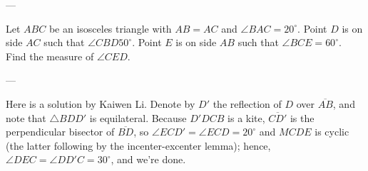 
---

Let $ABC$ be an isosceles triangle with $AB=AC$ and $\angle BAC=20^\circ$. Point $D$ is on side $AC$ such that $\angle CBD 50^\circ$. Point $E$ is on side $AB$ such that $\angle BCE=60^\circ$. Find the measure of $\angle CED$.

---

Here is a solution by Kaiwen Li. Denote by $D'$ the reflection of $D$ over $\overline{AB}$, and note that $\triangle BDD'$ is equilateral. Because $D'DCB$ is a kite, $\overline{CD'}$ is the perpendicular bisector of $\overline{BD}$, so $\angle ECD'=\angle ECD=20^\circ$ and $MCDE$ is cyclic (the latter following by the incenter-excenter lemma); hence, $\angle DEC=\angle DD'C=30^\circ$, and we're done.
